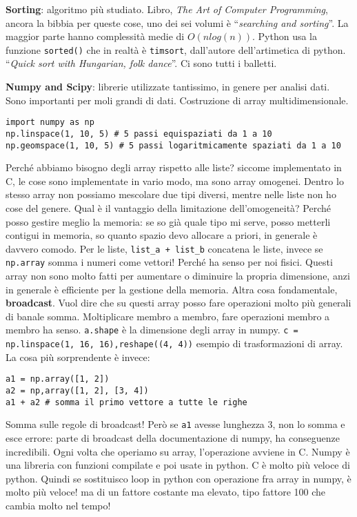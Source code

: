 \documentclass[10pt, a4paper, titlepage]{book}
\begin{document}
\textbf{Sorting}: algoritmo più studiato. Libro, \emph{The Art of Computer Programming}, ancora la bibbia per queste cose, uno dei sei volumi è ``\textit{searching and sorting}''.
La maggior parte hanno complessità medie di $O\left(n log(n)\right)$. Python usa la funzione \texttt{sorted()} che in realtà è \texttt{timsort}, dall'autore dell'artimetica di python.
``\textit{Quick sort with Hungarian, folk dance}''. Ci sono tutti i balletti.

\textbf{Numpy and Scipy}: librerie utilizzate tantissimo, in genere per analisi dati. Sono importanti per moli grandi di dati.
Costruzione di array multidimensionale.

\begin{verbatim}
import numpy as np
np.linspace(1, 10, 5) # 5 passi equispaziati da 1 a 10 
np.geomspace(1, 10, 5) # 5 passi logaritmicamente spaziati da 1 a 10
\end{verbatim}

Perché abbiamo bisogno degli array rispetto alle liste? siccome implementato in C, le cose sono implementate in vario modo, ma sono array omogenei. Dentro lo stesso array non possiamo mescolare due tipi diversi, mentre nelle liste non ho cose del genere.
Qual è il vantaggio della limitazione dell'omogeneità?
Perché posso gestire meglio la memoria: se so già quale tipo mi serve, posso metterli contigui in memoria, so quanto spazio devo allocare a priori, in generale è davvero comodo.
Per le liste, \texttt{list\_a + list\_b} concatena le liste, invece se \texttt{np.array} somma i numeri come vettori! Perché ha senso per noi fisici.
Questi array non sono molto fatti per aumentare o diminuire la propria dimensione, anzi in generale è efficiente per la gestione della memoria.
Altra cosa fondamentale, \textbf{broadcast}. Vuol dire che su questi array posso fare operazioni molto più generali di banale somma. Moltiplicare membro a membro, fare operazioni membro a membro ha senso.
\texttt{a.shape} è la dimensione degli array in numpy.
\texttt{c = np.linspace(1, 16, 16),reshape((4, 4))} esempio di trasformazioni di array.
La cosa più sorprendente è invece:

\begin{verbatim}
a1 = np.array([1, 2])
a2 = np,array([1, 2], [3, 4])
a1 + a2 # somma il primo vettore a tutte le righe
\end{verbatim}

Somma sulle regole di broadcast! Però se \texttt{a1} avesse lunghezza 3, non lo somma e esce errore: parte di broadcast della documentazione di numpy, ha conseguenze incredibili.
Ogni volta che operiamo su array, l'operazione avviene in C. Numpy è una libreria con funzioni compilate e poi usate in python. C è molto più veloce di python. 
Quindi se sostituisco loop in python con operazione fra array in numpy, è molto più veloce! ma di un fattore costante ma elevato, tipo fattore 100 che cambia molto nel tempo!
\end{document}
